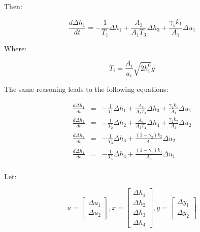 Then:

$$
    \frac{d\Delta h_1}{dt} =
    - \frac{1}{T_1}\Delta h_1
    + \frac{A_3}{A_1T_3}\Delta h_3
    + \frac{\gamma_1k_1}{A_1}\Delta u_1 
$$

Where: 

$$\boxed{T_i = \frac{A_i}{a_i}\sqrt{2h_i^0}{g}}$$

The same reasoning leads to the following equations:

$$
\begin{array}{rcl}
    \frac{d\Delta h_1}{dt} & = &
    - \frac{1}{T_1}\Delta h_1
    + \frac{A_3}{A_1T_3}\Delta h_3
    + \frac{\gamma_1k_1}{A_1}\Delta u_1 \\

    \frac{d\Delta h_2}{dt} & = &
    - \frac{1}{T_2}\Delta h_2
    + \frac{A_4}{A_2T_4}\Delta h_4
    + \frac{\gamma_2k_2}{A_2}\Delta u_2 \\
    
    \frac{d\Delta h_3}{dt} & = &
    - \frac{1}{T_3}\Delta h_3
    + \frac{(1-\gamma_2)k_2}{A_3}\Delta u_2 \\
    
    \frac{d\Delta h_4}{dt} & = &
    - \frac{1}{T_4}\Delta h_4
    + \frac{(1-\gamma_1)k_1}{A_4}\Delta u_1 \\
\end{array}
$$

Let:

$$
u = \left[\begin{array}{c} \Delta u_1 \\ \Delta u_2 \end{array} \right],
x = \left[\begin{array}{c} \Delta h_1 \\ \Delta h_2 \\ \Delta h_3 \\ \Delta h_4  \end{array} \right],
y = \left[\begin{array}{c} \Delta y_1 \\ \Delta y_2 \end{array} \right]
$$

